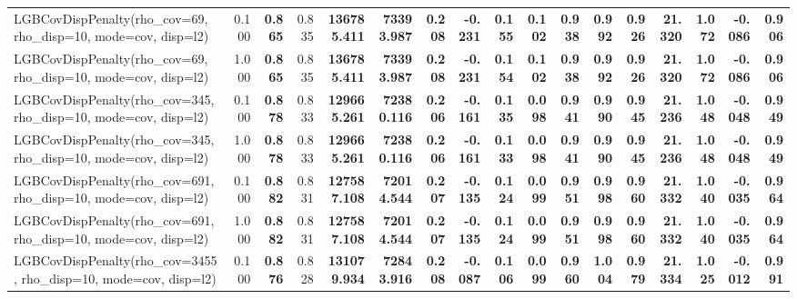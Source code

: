 \documentclass[11pt]{article}
\theoremstyle{plain}
\theoremstyle{definition}
\newcommand{\1}{\mathbf{1}}
\begin{document}
\begin{table}[htbp]
{\begin{tabular}{lrrrrrrrrrrrrrrrr}
LGBCovDispPenalty(rho_cov=69, rho_disp=10, mode=cov, disp=l2) & 0.100 & \textbf{0.865} & 0.835 & \textbf{136785.411} & \textbf{73393.987} & \textbf{0.208} & \textbf{-0.231} & \textbf{0.155} & \textbf{0.102} & \textbf{0.938} & \textbf{0.992} & \textbf{0.926} & \textbf{21.320} & \textbf{1.072} & \textbf{-0.086} & \textbf{0.906} \\
LGBCovDispPenalty(rho_cov=69, rho_disp=10, mode=cov, disp=l2) & 1.000 & \textbf{0.865} & 0.835 & \textbf{136785.411} & \textbf{73393.987} & \textbf{0.208} & \textbf{-0.231} & \textbf{0.154} & \textbf{0.102} & \textbf{0.938} & \textbf{0.992} & \textbf{0.926} & \textbf{21.320} & \textbf{1.072} & \textbf{-0.086} & \textbf{0.906} \\
LGBCovDispPenalty(rho_cov=345, rho_disp=10, mode=cov, disp=l2) & 0.100 & \textbf{0.878} & 0.833 & \textbf{129665.261} & \textbf{72380.116} & \textbf{0.206} & \textbf{-0.161} & \textbf{0.135} & \textbf{0.098} & \textbf{0.941} & \textbf{0.990} & \textbf{0.945} & \textbf{21.236} & \textbf{1.048} & \textbf{-0.048} & \textbf{0.949} \\
LGBCovDispPenalty(rho_cov=345, rho_disp=10, mode=cov, disp=l2) & 1.000 & \textbf{0.878} & 0.833 & \textbf{129665.261} & \textbf{72380.116} & \textbf{0.206} & \textbf{-0.161} & \textbf{0.133} & \textbf{0.098} & \textbf{0.941} & \textbf{0.990} & \textbf{0.945} & \textbf{21.236} & \textbf{1.048} & \textbf{-0.048} & \textbf{0.949} \\
LGBCovDispPenalty(rho_cov=691, rho_disp=10, mode=cov, disp=l2) & 0.100 & \textbf{0.882} & 0.831 & \textbf{127587.108} & \textbf{72014.544} & \textbf{0.207} & \textbf{-0.135} & \textbf{0.124} & \textbf{0.099} & \textbf{0.951} & \textbf{0.998} & \textbf{0.960} & \textbf{21.332} & \textbf{1.040} & \textbf{-0.035} & \textbf{0.964} \\
LGBCovDispPenalty(rho_cov=691, rho_disp=10, mode=cov, disp=l2) & 1.000 & \textbf{0.882} & 0.831 & \textbf{127587.108} & \textbf{72014.544} & \textbf{0.207} & \textbf{-0.135} & \textbf{0.124} & \textbf{0.099} & \textbf{0.951} & \textbf{0.998} & \textbf{0.960} & \textbf{21.332} & \textbf{1.040} & \textbf{-0.035} & \textbf{0.964} \\
LGBCovDispPenalty(rho_cov=3455, rho_disp=10, mode=cov, disp=l2) & 0.100 & \textbf{0.876} & 0.828 & \textbf{131079.934} & \textbf{72843.916} & \textbf{0.208} & \textbf{-0.087} & \textbf{0.106} & \textbf{0.099} & \textbf{0.960} & \textbf{1.004} & \textbf{0.979} & \textbf{21.334} & \textbf{1.025} & \textbf{-0.012} & \textbf{0.991} \\

\end{tabular}}
\end{table}
\end{document}
